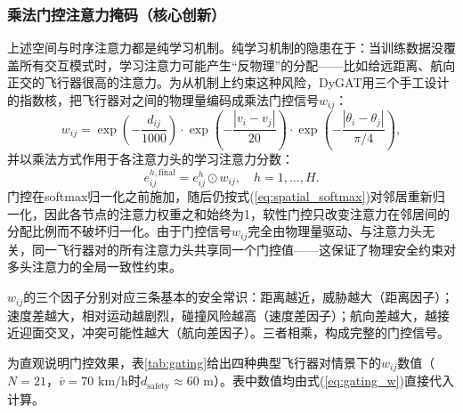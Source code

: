 \documentclass[12pt,a4paper,UTF8]{ctexart}
\begin{document}
\subsubsection{乘法门控注意力掩码（核心创新）}

上述空间与时序注意力都是纯学习机制。纯学习机制的隐患在于：当训练数据没覆盖所有交互模式时，学习注意力可能产生“反物理”的分配——比如给远距离、航向正交的飞行器很高的注意力。为从机制上约束这种风险，DyGAT用三个手工设计的指数核，把飞行器对之间的物理量编码成乘法门控信号$w_{ij}$：
\begin{equation}
    w_{ij} = \exp\!\left(-\frac{d_{ij}}{1000}\right) \cdot \exp\!\left(-\frac{|v_i - v_j|}{20}\right) \cdot \exp\!\left(-\frac{|\theta_i - \theta_j|}{\pi/4}\right),
    \label{eq:gating_w}
\end{equation}
并以乘法方式作用于各注意力头的学习注意力分数：
\begin{equation}
    e_{ij}^{h,\text{final}} = e_{ij}^{h} \odot w_{ij},\quad h=1,\ldots,H.
    \label{eq:gating_final}
\end{equation}
门控在softmax归一化之前施加，随后仍按式(\ref{eq:spatial_softmax})对邻居重新归一化，因此各节点的注意力权重之和始终为1，软性门控只改变注意力在邻居间的分配比例而不破坏归一化。由于门控信号$w_{ij}$完全由物理量驱动、与注意力头无关，同一飞行器对的所有注意力头共享同一个门控值——这保证了物理安全约束对多头注意力的全局一致性约束。

$w_{ij}$的三个因子分别对应三条基本的安全常识：距离越近，威胁越大（距离因子）；速度差越大，相对运动越剧烈，碰撞风险越高（速度差因子）；航向差越大，越接近迎面交叉，冲突可能性越大（航向差因子）。三者相乘，构成完整的门控信号。

为直观说明门控效果，表\ref{tab:gating}给出四种典型飞行器对情景下的$w_{ij}$数值（$N=21$，$\bar{v}=70$ $\mathrm{km/h}$时$d_{\text{safety}}\approx60$ m）。表中数值均由式(\ref{eq:gating_w})直接代入计算。

\begin{table}[H]
    \centering\small
    \caption{$w_{ij}$在不同飞行器对情景下的门控效果（按式(\ref{eq:gating_w})计算）}
    \label{tab:gating}
\end{table}
\end{document}
